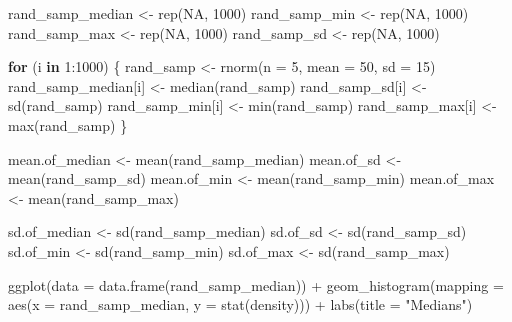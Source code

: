 \documentclass[
]{article}
\newenvironment{Shaded}{\begin{snugshade}}{\end{snugshade}}
\newcommand{\AttributeTok}[1]{\textcolor[rgb]{0.77,0.63,0.00}{#1}}
\newcommand{\ConstantTok}[1]{\textcolor[rgb]{0.00,0.00,0.00}{#1}}
\newcommand{\ControlFlowTok}[1]{\textcolor[rgb]{0.13,0.29,0.53}{\textbf{#1}}}
\newcommand{\DecValTok}[1]{\textcolor[rgb]{0.00,0.00,0.81}{#1}}
\newcommand{\FunctionTok}[1]{\textcolor[rgb]{0.00,0.00,0.00}{#1}}
\newcommand{\NormalTok}[1]{#1}
\newcommand{\OtherTok}[1]{\textcolor[rgb]{0.56,0.35,0.01}{#1}}
\newcommand{\SpecialCharTok}[1]{\textcolor[rgb]{0.00,0.00,0.00}{#1}}
\newcommand{\StringTok}[1]{\textcolor[rgb]{0.31,0.60,0.02}{#1}}
\begin{document}
\begin{Shaded}
\begin{Highlighting}[]
\NormalTok{rand\_samp\_median }\OtherTok{\textless{}{-}} \FunctionTok{rep}\NormalTok{(}\ConstantTok{NA}\NormalTok{, }\DecValTok{1000}\NormalTok{)}
\NormalTok{rand\_samp\_min }\OtherTok{\textless{}{-}} \FunctionTok{rep}\NormalTok{(}\ConstantTok{NA}\NormalTok{, }\DecValTok{1000}\NormalTok{)}
\NormalTok{rand\_samp\_max }\OtherTok{\textless{}{-}} \FunctionTok{rep}\NormalTok{(}\ConstantTok{NA}\NormalTok{, }\DecValTok{1000}\NormalTok{)}
\NormalTok{rand\_samp\_sd }\OtherTok{\textless{}{-}} \FunctionTok{rep}\NormalTok{(}\ConstantTok{NA}\NormalTok{, }\DecValTok{1000}\NormalTok{)}

\ControlFlowTok{for}\NormalTok{ (i }\ControlFlowTok{in} \DecValTok{1}\SpecialCharTok{:}\DecValTok{1000}\NormalTok{) \{}
\NormalTok{  rand\_samp }\OtherTok{\textless{}{-}} \FunctionTok{rnorm}\NormalTok{(}\AttributeTok{n =} \DecValTok{5}\NormalTok{, }\AttributeTok{mean =} \DecValTok{50}\NormalTok{, }\AttributeTok{sd =} \DecValTok{15}\NormalTok{)}
\NormalTok{  rand\_samp\_median[i] }\OtherTok{\textless{}{-}} \FunctionTok{median}\NormalTok{(rand\_samp)}
\NormalTok{  rand\_samp\_sd[i] }\OtherTok{\textless{}{-}} \FunctionTok{sd}\NormalTok{(rand\_samp)}
\NormalTok{  rand\_samp\_min[i] }\OtherTok{\textless{}{-}} \FunctionTok{min}\NormalTok{(rand\_samp)}
\NormalTok{  rand\_samp\_max[i] }\OtherTok{\textless{}{-}} \FunctionTok{max}\NormalTok{(rand\_samp)}
\NormalTok{\}}

\NormalTok{mean.of\_median }\OtherTok{\textless{}{-}} \FunctionTok{mean}\NormalTok{(rand\_samp\_median)}
\NormalTok{mean.of\_sd }\OtherTok{\textless{}{-}} \FunctionTok{mean}\NormalTok{(rand\_samp\_sd)}
\NormalTok{mean.of\_min }\OtherTok{\textless{}{-}} \FunctionTok{mean}\NormalTok{(rand\_samp\_min)}
\NormalTok{mean.of\_max }\OtherTok{\textless{}{-}} \FunctionTok{mean}\NormalTok{(rand\_samp\_max)}

\NormalTok{sd.of\_median }\OtherTok{\textless{}{-}} \FunctionTok{sd}\NormalTok{(rand\_samp\_median)}
\NormalTok{sd.of\_sd }\OtherTok{\textless{}{-}} \FunctionTok{sd}\NormalTok{(rand\_samp\_sd)}
\NormalTok{sd.of\_min }\OtherTok{\textless{}{-}} \FunctionTok{sd}\NormalTok{(rand\_samp\_min)}
\NormalTok{sd.of\_max }\OtherTok{\textless{}{-}} \FunctionTok{sd}\NormalTok{(rand\_samp\_max)}


\FunctionTok{ggplot}\NormalTok{(}\AttributeTok{data =} \FunctionTok{data.frame}\NormalTok{(rand\_samp\_median)) }\SpecialCharTok{+}
  \FunctionTok{geom\_histogram}\NormalTok{(}\AttributeTok{mapping =} \FunctionTok{aes}\NormalTok{(}\AttributeTok{x =}\NormalTok{ rand\_samp\_median, }\AttributeTok{y =} \FunctionTok{stat}\NormalTok{(density))) }\SpecialCharTok{+}
  \FunctionTok{labs}\NormalTok{(}\AttributeTok{title =} \StringTok{"Medians"}\NormalTok{)}
\end{Highlighting}
\end{Shaded}
\end{document}
